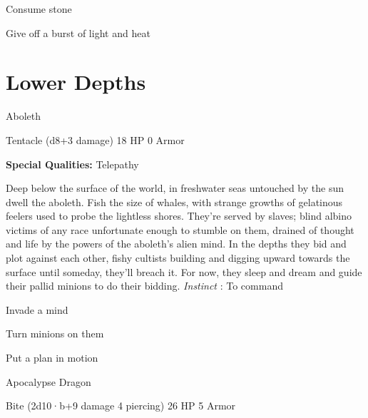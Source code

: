 \startitemize[1,packed]
         
\item Consume stone

         
\item Give off a burst of light and heat

       
\stopitemize
                
\section{Lower Depths}   
            
\startMonsterName
Aboleth	 
\stopMonsterName
       

Tentacle (d8+3 damage)	18 HP	0 Armor

       


       
\startMonsterQualities
         {\bf Special Qualities:}  Telepathy
\stopMonsterQualities
       
\startMonsterDescription
Deep below the surface of the world, in freshwater seas untouched by the sun dwell the aboleth. Fish the size of whales, with strange growths of gelatinous feelers used to probe the lightless shores. They’re served by slaves; blind albino victims of any race unfortunate enough to stumble on them, drained of thought and life by the powers of the aboleth’s alien mind. In the depths they bid and plot against each other, fishy cultists building and digging upward towards the surface until someday, they’ll breach it. For now, they sleep and dream and guide their pallid minions to do their bidding. {\em Instinct} : To command
\stopMonsterDescription
       
\startitemize[1,packed]
         
\item Invade a mind

         
\item Turn minions on them

         
\item Put a plan in motion

       
\stopitemize
       
\startMonsterName
Apocalypse Dragon	 
\stopMonsterName
       

Bite (2d10·b+9 damage 4 piercing)	26 HP	5 Armor

       

